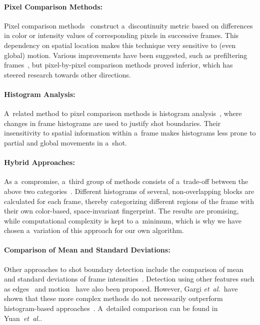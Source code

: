 \paragraph{Pixel Comparison Methods:}

Pixel comparison methods~\cite{hampapur1994videosegmentation,
zhang1993videopartitioning} construct a~discontinuity metric
based on differences in color or intensity values
of corresponding pixels in successive frames.
This dependency on spatial location makes this technique
very sensitive to (even global) motion.
Various improvements have been suggested, such as prefiltering
frames~\cite{zhang1995videoparsing},
but pixel-by-pixel comparison methods proved inferior,
which has steered research towards other directions.

\paragraph{Histogram Analysis:}

A~related method to pixel comparison methods is
histogram analysis~\cite{otoole1999shotboundary},
where changes in frame histograms are used
to justify shot boundaries.
Their insensitivity to spatial information
within a~frame makes histograms less prone to partial
and global movements in a~shot.

\paragraph{Hybrid Approaches:}

As a~compromise, a~third group of methods consists of
a~trade-off between the above two
categories~\cite{ahmed1999keyframe}.
Different histograms of several, non-overlapping blocks
are calculated for each frame,
thereby categorizing different regions of the frame
with their own color-based, space-invariant fingerprint.
The results are promising, while computational complexity
is kept to a~minimum, which is why we have chosen
a~variation of this approach for our own algorithm.

\paragraph{Comparison of Mean and Standard Deviations:}

Other approaches to shot boundary detection include
the comparison of mean and standard deviations
of frame intensities~\cite{lienhart1999comparison}.
Detection using other features such as
edges~\cite{zabih1995scenebreaks} and
motion~\cite{bouthemy1997shotchange} have also been proposed.
However, Gargi \emph{et~al.}\ have shown that
these more complex methods do not necessarily
outperform histogram-based approaches~\cite{gargi2000videoshot}.
A~detailed comparison can be found in
Yuan~\emph{et~al.}\cite{yuan2007shotboundary}.

